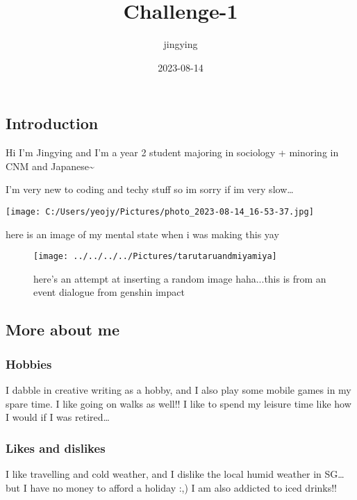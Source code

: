 \documentclass[
]{article}
\title{Challenge-1}
\author{jingying}
\date{2023-08-14}
\begin{document}
\maketitle

\hypertarget{introduction}{%
\subsection{Introduction}\label{introduction}}

Hi I'm Jingying and I'm a year 2 student majoring in sociology +
minoring in CNM and Japanese\textasciitilde{}

I'm very new to coding and techy stuff so im sorry if im very
slow\ldots{}

\texttt{[image: C:/Users/yeojy/Pictures/photo\_2023-08-14\_16-53-37.jpg]}

here is an image of my mental state when i was making this yay

\begin{figure}
\texttt{[image: ../../../../Pictures/tarutaruandmiyamiya]} \caption{here's an attempt at inserting a random image haha...this is from an event dialogue from genshin impact}\label{fig:unnamed-chunk-1}
\end{figure}

\hypertarget{more-about-me}{%
\subsection{More about me}\label{more-about-me}}

\hypertarget{hobbies}{%
\subsubsection{Hobbies}\label{hobbies}}

I dabble in creative writing as a hobby, and I also play some mobile
games in my spare time. I like going on walks as well!! I like to spend
my leisure time like how I would if I was retired\ldots{}

\hypertarget{likes-and-dislikes}{%
\subsubsection{Likes and dislikes}\label{likes-and-dislikes}}

I like travelling and cold weather, and I dislike the local humid
weather in SG\ldots but I have no money to afford a holiday :,) I am
also addicted to iced drinks!!
\end{document}
